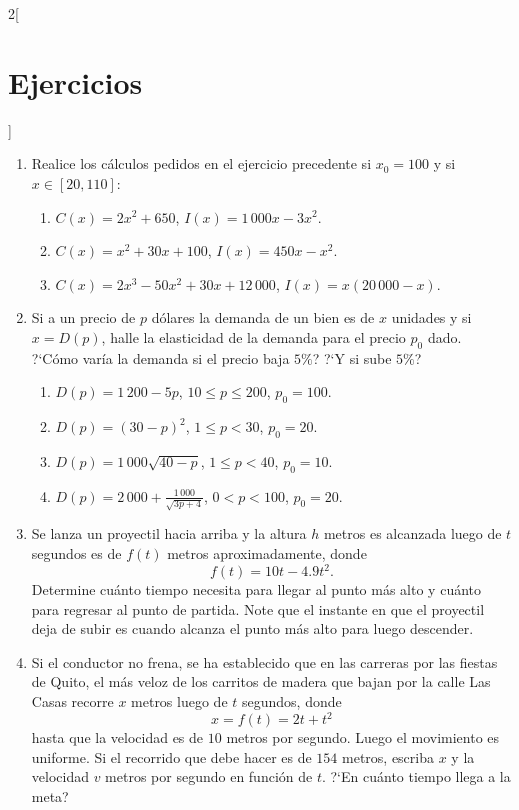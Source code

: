 \begin{multicols}{2}[\section{Ejercicios}]
\begin{enumerate}[leftmargin=*]
\item Realice los cálculos pedidos en el ejercicio precedente si $x_0 = 100$ y si $x \in
    [20,110]$:
    \begin{enumerate}[leftmargin=*]
    \item $C(x) = 2x^2 + 650$, $I(x) = 1\,000x - 3x^2$.
    \item $C(x) = x^2 + 30x + 100$, $I(x) = 450x - x^2$.
    \item $C(x) = 2x^3 - 50x^2 + 30x + 12\,000$, $I(x) = x(20\,000 - x)$.
    \end{enumerate}

\item Si a un precio de $p$ dólares la demanda de un bien es de $x$ unidades y si $x = D(p)$,
    halle la elasticidad de la demanda para el precio $p_0$ dado. ?`Cómo varía la demanda si el
    precio baja $5\%$? ?`Y si sube $5\%$?
    \begin{enumerate}[leftmargin=*]
    \item $\displaystyle D(p) = 1\,200 - 5p$, $10 \leq p \leq 200$, $p_0 = 100$.
    \item $\displaystyle D(p) = (30 -p)^2$, $1 \leq p < 30$, $p_0 = 20$.
    \item $\displaystyle D(p) = 1\,000\sqrt{40 - p}$, $1 \leq p < 40$, $p_0 = 10$.
    \item $\displaystyle D(p) = 2\,000 + \frac{1\,000}{\sqrt{3p + 4}}$, $0 < p < 100$, $p_0
        = 20$.
    \end{enumerate}

\item Se lanza un proyectil hacia arriba y la altura $h$ metros es alcanzada luego de $t$
    segundos es de $f(t)$ metros aproximadamente, donde
    \[
      f(t) = 10t - 4.9t^2.
    \]
    Determine cuánto tiempo necesita para llegar al punto más alto y cuánto para regresar al
    punto de partida. Note que el instante en que el proyectil deja de subir es cuando alcanza
    el punto más alto para luego descender.

\item Si el conductor no frena, se ha establecido que en las carreras por las fiestas de Quito,
    el más veloz de los carritos de madera que bajan por la calle Las Casas recorre $x$ metros
    luego de $t$ segundos, donde
    \[
      x = f(t) = 2t + t^2
    \]
    hasta que la velocidad es de $10$ metros por segundo. Luego el movimiento es uniforme. Si
    el recorrido que debe hacer es de $154$ metros, escriba $x$ y la velocidad $v$ metros por
    segundo en función de $t$. ?`En cuánto tiempo llega a la meta?
\end{enumerate}
\endgroup
\end{multicols}
\cleartooddpage[\thispagestyle{empty}]
